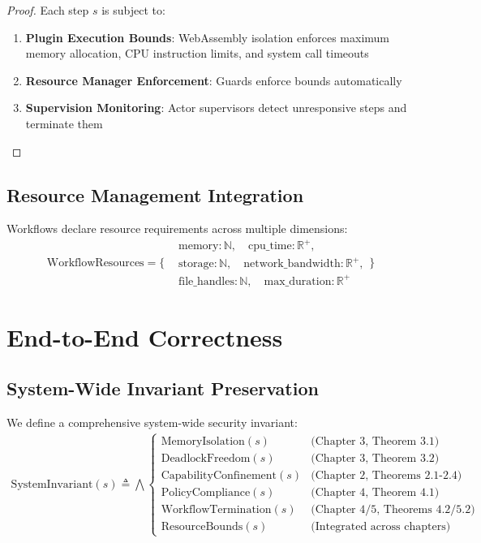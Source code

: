 \begin{proof}
Each step $s$ is subject to:
\begin{enumerate}
\item \textbf{Plugin Execution Bounds}: WebAssembly isolation enforces maximum memory allocation, CPU instruction limits, and system call timeouts
\item \textbf{Resource Manager Enforcement}: Guards enforce bounds automatically
\item \textbf{Supervision Monitoring}: Actor supervisors detect unresponsive steps and terminate them
\end{enumerate}
\end{proof}

\subsection{Resource Management Integration}

Workflows declare resource requirements across multiple dimensions:
$$\text{WorkflowResources} = \{
\begin{aligned}
&\text{memory}: \mathbb{N}, \quad \text{cpu\_time}: \mathbb{R}^+, \\
&\text{storage}: \mathbb{N}, \quad \text{network\_bandwidth}: \mathbb{R}^+, \\
&\text{file\_handles}: \mathbb{N}, \quad \text{max\_duration}: \mathbb{R}^+
\end{aligned}
\}$$

\newpage

\section{End-to-End Correctness}

\subsection{System-Wide Invariant Preservation}

\begin{definition}
We define a comprehensive system-wide security invariant:
\begin{align}
\text{SystemInvariant}(s) \triangleq \bigwedge \begin{cases}
\text{MemoryIsolation}(s) & \text{(Chapter 3, Theorem 3.1)} \\
\text{DeadlockFreedom}(s) & \text{(Chapter 3, Theorem 3.2)} \\
\text{CapabilityConfinement}(s) & \text{(Chapter 2, Theorems 2.1-2.4)} \\
\text{PolicyCompliance}(s) & \text{(Chapter 4, Theorem 4.1)} \\
\text{WorkflowTermination}(s) & \text{(Chapter 4/5, Theorems 4.2/5.2)} \\
\text{ResourceBounds}(s) & \text{(Integrated across chapters)}
\end{cases}
\end{align}
\end{definition}

